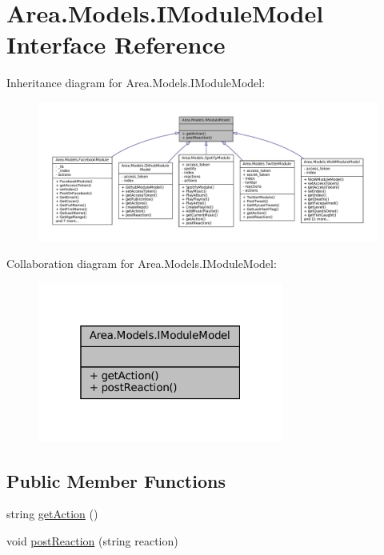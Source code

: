 \hypertarget{interfaceArea_1_1Models_1_1IModuleModel}{}\section{Area.\+Models.\+I\+Module\+Model Interface Reference}
\label{interfaceArea_1_1Models_1_1IModuleModel}


Inheritance diagram for Area.\+Models.\+I\+Module\+Model\+:
\nopagebreak
\begin{figure}[H]
\begin{center}
\leavevmode
\includegraphics[width=350pt]{interfaceArea_1_1Models_1_1IModuleModel__inherit__graph}
\end{center}
\end{figure}


Collaboration diagram for Area.\+Models.\+I\+Module\+Model\+:
\nopagebreak
\begin{figure}[H]
\begin{center}
\leavevmode
\includegraphics[width=229pt]{interfaceArea_1_1Models_1_1IModuleModel__coll__graph}
\end{center}
\end{figure}
\subsection*{Public Member Functions}
\begin{DoxyCompactItemize}
\item 
string \mbox{\hyperlink{interfaceArea_1_1Models_1_1IModuleModel_a050d892fae9f85c6b607a7c0e30502e9}{get\+Action}} ()
\item 
void \mbox{\hyperlink{interfaceArea_1_1Models_1_1IModuleModel_af2c1a82bd894255ab2099440f4f3d6f7}{post\+Reaction}} (string reaction)
\end{DoxyCompactItemize}


